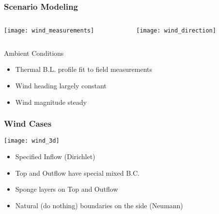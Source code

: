 \documentclass[mathserif]{beamer}
\begin{document}
%
%
%
\begin{frame}
\frametitle{Scenario Modeling}
 
 \begin{columns}[]
  \begin{column}{0.45\linewidth}

   \begin{center}
    \texttt{[image: wind\_measurements]}
   \end{center}

  \end{column}
  \begin{column}{0.55\linewidth}
 
   \begin{center}
    \texttt{[image: wind\_direction]}
   \end{center}
  
  \end{column}
\end{columns}


  \begin{block}{Ambient Conditions}
  \begin{itemize}
  \item	Thermal B.L. profile fit to field measurements
  \item Wind heading largely constant 
  \item Wind magnitude steady 
  \end{itemize}
  \end{block}	

\end{frame}


%
%
%
\begin{frame}
\frametitle{Wind Cases}

\begin{block}

   \begin{center}
    \texttt{[image: wind\_3d]}
   \end{center}

   \begin{itemize}
   \item Specified Inflow (Dirichlet)
   \item Top and Outflow have special mixed B.C.
   \item Sponge layers on Top and Outflow
   \item Natural (do nothing) boundaries on the side (Neumann)
   \end{itemize}

\end{block}
\end{frame}
\end{document}
